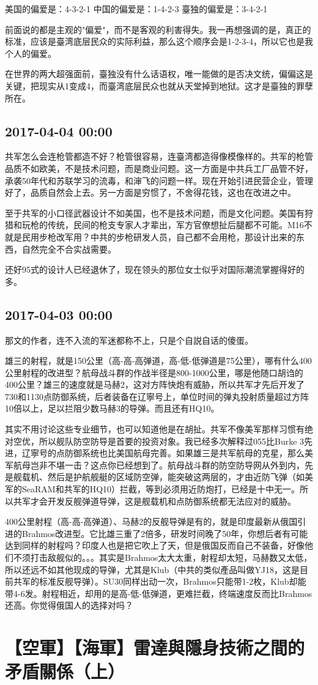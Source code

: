 \documentclass[twocolumn]{ctexart}
\begin{document}
美国的偏爱是：4-3-2-1
中国的偏爱是：1-4-2-3
臺独的偏爱是：3-4-2-1

前面说的都是主观的"偏爱"，而不是客观的利害得失。我一再想强调的是，真正的标准，应该是臺湾底层民众的实际利益，那么这个顺序会是1-2-3-4，所以它也是我个人的偏爱。

在世界的两大超强面前，臺独没有什么话语权，唯一能做的是否决文统，偏偏这是关键，把现实从1变成4，而臺湾底层民众也就从天堂掉到地狱。这才是臺独的罪孽所在。\subsection*{2017-04-04 00:00}
共军怎么会连枪管都造不好？枪管很容易，连臺湾都造得像模像样的。共军的枪管品质不如欧美，不是技术问题，而是商业问题。这一方面是中共兵工厂品管不好，承袭50年代和苏联学习的流毒，和渖飞的问题一样。现在开始引进民营企业，管理好了，品质自然会上去。另一方面是穷惯了，不舍得花钱，这也在改进之中。

至于共军的小口径武器设计不如美国，也不是技术问题，而是文化问题。美国有狩猎和玩枪的传统，民间的枪支专家人才辈出，军方官僚想扯后腿都不可能。M16不就是民用步枪改军用？中共的步枪研发人员，自己都不会用枪，那设计出来的东西，自然完全不合实战需要。

还好95式的设计人已经退休了，现在领头的那位女士似乎对国际潮流掌握得好的多。\subsection*{2017-04-03 00:00}
那文的作者，连不入流的军迷都称不上，只是个自説自话的傻蛋。

雄三的射程，就是150公里（高-高-高弹道，高-低-低弹道是75公里），哪有什么400公里射程的改进型？航母战斗群的作战半径是800-1000公里，哪是他随口胡诌的400公里？雄三的速度就是马赫2，这对方阵快炮有威胁，所以共军才先后开发了730和1130点防御系统，后者装备在辽寧号上，单位时间的弹丸投射质量超过方阵10倍以上，足以拦阻少数马赫3的导弹。而且还有HQ10。

其实不用讨论这些专业细节，也可以知道他是在胡扯。共军不像美军那样习惯有绝对空优，所以舰队防空防导是首要的投资对象。我已经多次解释过055比Burke 3先进，辽寧号的点防御系统也比美国航母完善。如果雄三是共军航母的克星，那么美军航母岂非不堪一击？这点你已经想到了。航母战斗群的防空防导网从外到内，先是舰载机、然后是护航舰艇的区域防空弹，能突破这两层的，才由近防飞弹（如美军的SeaRAM和共军的HQ10）拦截，等到必须用近防炮打，已经是十中无一。所以共军才会开发反舰弹道导弹，这是舰载机和点防御系统都无法应对的威胁。

400公里射程（高-高-高弹道）、马赫2的反舰导弹是有的，就是印度最新从俄国引进的Brahmos改进型。它比雄三重了2倍多，研发时间晚了50年，你想后者有可能达到同样的射程吗？印度人也是把它吹上了天，但是俄国反而自己不装备，好像他们不须打击敌舰似的。。。其实是Brahmos太大太重，射程却太短，马赫数又太低，所以还远不如其他现成的导弹，尤其是Klub（中共的类似產品叫做YJ18，这是目前共军的标准反舰导弹）。SU30同样出动一次，Brahmos只能带1-2枚，Klub却能带4-6发。射程相近，却用的是高-低-低弹道，更难拦截，终端速度反而比Brahmos还高。你觉得俄国人的选择对吗？\section*{【空軍】【海軍】雷達與隱身技術之間的矛盾關係（上）}
\end{document}
